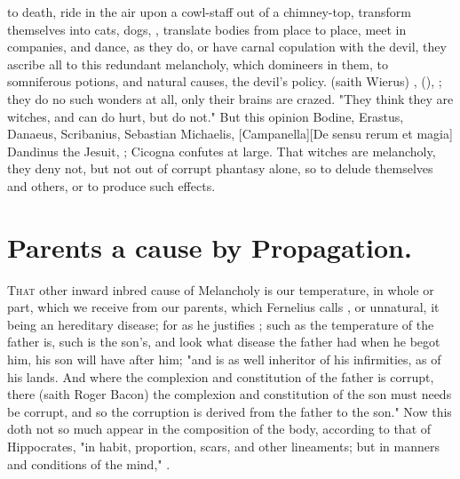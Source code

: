 to death, ride in the air upon a cowl-staff out of a chimney-top, transform
themselves into cats, dogs, \etc{}, translate bodies from place to place, meet
in companies, and dance, as they do, or have carnal copulation with the devil,
they ascribe all to this redundant melancholy, which domineers in them, to
somniferous potions, and natural causes, the devil's
policy.  (saith Wierus) ,
(), ; they do no such wonders at all, only their
brains are crazed. "They think they
are witches, and can do hurt, but do not." But this opinion Bodine, Erastus,
Danaeus, Scribanius, Sebastian Michaelis, [Campanella][\textlatin{De sensu rerum et magia}]  Dandinus the Jesuit,
; Cicogna
confutes at large. That witches are melancholy, they deny not, but not out of
corrupt phantasy alone, so to delude themselves and others, or to produce such
effects.

\section{Parents a cause by Propagation.}

\lettrine{T}{hat} other inward inbred cause of Melancholy is our temperature,
in whole or part, which we receive from our parents, which
Fernelius calls , or unnatural, it
being an hereditary disease; for as he justifies ; such as the temperature of the father is, such is the son's, and
look what disease the father had when he begot him, his son will have after
him; "and is as well inheritor of his infirmities, as of
his lands. And where the complexion and constitution of the father is corrupt,
there (saith Roger Bacon) the complexion and constitution
of the son must needs be corrupt, and so the corruption is derived from the
father to the son." Now this doth not so much appear in the composition of the
body, according to that of Hippocrates, "in habit,
proportion, scars, and other lineaments; but in manners and conditions of the
mind," .

